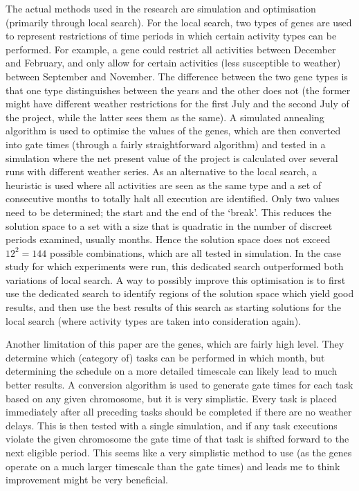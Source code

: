 \documentclass[a4paper,12pt]{article}
\begin{document}
The actual methods used in the research are simulation and optimisation (primarily through local search). For the local search, two types of genes are used to represent restrictions of time periods in which certain activity types can be performed. For example, a gene could restrict all activities between December and February, and only allow for certain activities (less susceptible to weather) between September and November. The difference between the two gene types is that one type distinguishes between the years and the other does not (the former might have different weather restrictions for the first July and the second July of the project, while the latter sees them as the same). A simulated annealing algorithm is used to optimise the values of the genes, which are then converted into gate times (through a fairly straightforward algorithm) and tested in a simulation where the net present value of the project is calculated over several runs with different weather series. As an alternative to the local search, a heuristic is used where all activities are seen as the same type and a set of consecutive months to totally halt all execution are identified. Only two values need to be determined; the start and the end of the `break'. This reduces the solution space to a set with a size that is quadratic in the number of discreet periods examined, usually months. Hence the solution space does not exceed $12^2 = 144$ possible combinations, which are all tested in simulation. In the case study for which experiments were run, this dedicated search outperformed both variations of local search. A way to possibly improve this optimisation is to first use the dedicated search to identify regions of the solution space which yield good results, and then use the best results of this search as starting solutions for the local search (where activity types are taken into consideration again). 

Another limitation of this paper are the genes, which are fairly high level. They determine which (category of) tasks can be performed in which month, but determining the schedule on a more detailed timescale can likely lead to much better results. A conversion algorithm is used to generate gate times for each task based on any given chromosome, but it is very simplistic. Every task is placed immediately after all preceding tasks should be completed if there are no weather delays. This is then tested with a single simulation, and if any task executions violate the given chromosome the gate time of that task is shifted forward to the next eligible period. This seems like a very simplistic method to use (as the genes operate on a much larger timescale than the gate times) and leads me to think improvement might be very beneficial.
\end{document}
